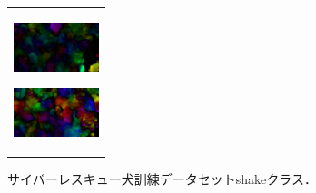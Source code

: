 \begin{enumerate}
\begin{end}
\begin{figure}[H]
\begin{tabular}{l}
\begin{minipage}{0.165\hsize}
\begin{center}
          \includegraphics[clip, width=2.5cm]{./Figures/optic_shake4.eps}
          \hspace{0.1cm} { }
        \end{center}
      \end{minipage}
      \begin{minipage}{0.165\hsize}
        \begin{center}
          \includegraphics[clip, width=2.5cm]{./Figures/optic_shake5.eps}
          \hspace{2.2cm} { }
        \end{center}
      \end{minipage}
    \end{tabular}
    \caption{サイバーレスキュー犬訓練データセットshakeクラス．}
    \label{shake}
\end{figure}

\begin{figure}[H]
    \begin{tabular}{l}


\\ %



\end{tabular}
\end{figure}
\end{end}
\end{enumerate}
